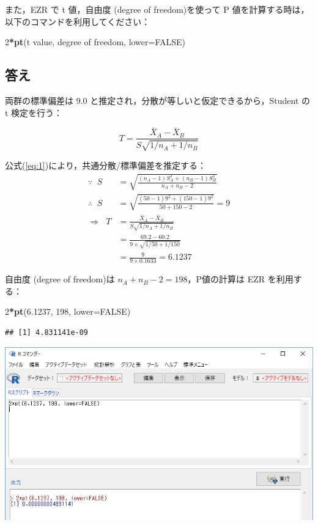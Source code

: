 \documentclass[11pt,]{problemset}
\newenvironment{Shaded}{\begin{snugshade}}{\end{snugshade}}
\newcommand{\DataTypeTok}[1]{\textcolor[rgb]{0.13,0.29,0.53}{#1}}
\newcommand{\DecValTok}[1]{\textcolor[rgb]{0.00,0.00,0.81}{#1}}
\newcommand{\FloatTok}[1]{\textcolor[rgb]{0.00,0.00,0.81}{#1}}
\newcommand{\KeywordTok}[1]{\textcolor[rgb]{0.13,0.29,0.53}{\textbf{#1}}}
\newcommand{\NormalTok}[1]{#1}
\newcommand{\OperatorTok}[1]{\textcolor[rgb]{0.81,0.36,0.00}{\textbf{#1}}}
\newcommand{\OtherTok}[1]{\textcolor[rgb]{0.56,0.35,0.01}{#1}}
\begin{document}
また，EZR で t 値，自由度 (degree of freedom)を使って P
値を計算する時は，以下のコマンドを利用してください：

\begin{Shaded}
\begin{Highlighting}[]
\DecValTok{2}\OperatorTok{*}\KeywordTok{pt}\NormalTok{(t value, degree of freedom, }\DataTypeTok{lower=}\OtherTok{FALSE}\NormalTok{)}
\end{Highlighting}
\end{Shaded}

\subsection{答え}

両群の標準偏差は 9.0 と推定され，分散が等しいと仮定できるから，Student
の t 検定を行う：

\[
T = \frac{\bar{X}_A - \bar{X}_B}{S\sqrt{1/n_A + 1/n_B}}
\]

公式(\ref{eq:1})により，共通分散/標準偏差を推定する： \[
\begin{aligned}
\because\;\;  S & = \sqrt{\frac{(n_A - 1)S^2_A + (n_B - 1)S^2_B}{n_A + n_B -2}} \\
\therefore\;\; S & =  \sqrt{\frac{(50 - 1)9^2 + (150 - 1)9^2}{50 + 150 -2}} = 9 \\
\Rightarrow\;\; T & = \frac{\bar{X}_A - \bar{X}_B}{S\sqrt{1/n_A + 1/n_B}} \\ 
                  & = \frac{69.2 - 60.2}{9\times\sqrt{1/50 + 1/150}} \\ 
                  & = \frac{9}{9\times0.1633} = 6.1237
\end{aligned}
\]

自由度 (degree of freedom)は \(n_A + n_B -2 = 198\)，P値の計算は EZR
を利用する：

\begin{Shaded}
\begin{Highlighting}[]
\DecValTok{2}\OperatorTok{*}\KeywordTok{pt}\NormalTok{(}\FloatTok{6.1237}\NormalTok{, }\DecValTok{198}\NormalTok{, }\DataTypeTok{lower=}\OtherTok{FALSE}\NormalTok{)}
\end{Highlighting}
\end{Shaded}

\begin{verbatim}
## [1] 4.831141e-09
\end{verbatim}

\begin{center}\includegraphics[width=0.9\linewidth]{pic/tvaluepvalue00} \end{center}
\end{document}
